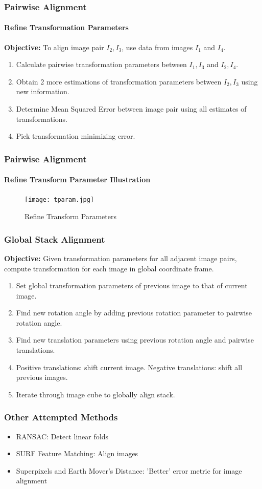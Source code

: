 \documentclass{beamer}
\begin{document}
\begin{frame}
\frametitle{Pairwise Alignment}
\framesubtitle{Refine Transformation Parameters}
\textbf{Objective:} To align image pair $I_2, I_3$, use data from images $I_1$ and $I_4$. \\
\begin{enumerate}
\item Calculate pairwise transformation parameters between $I_1,I_3$ and $I_2,I_4$.
\item Obtain 2 more estimations of transformation parameters between $I_2,I_3$ using new information.
\item Determine Mean Squared Error between image pair using all estimates of transformations.
\item Pick transformation minimizing error.
\end{enumerate}
\end{frame}

\begin{frame}
\frametitle{Pairwise Alignment}
\framesubtitle{Refine Transform Parameter Illustration}
\begin{figure}[p]
	\centering
	\texttt{[image: tparam.jpg]}
	\caption{Refine Transform Parameters}
	\label{fig:Tform Params}
\end{figure}
\end{frame}

\begin{frame}
\frametitle{Global Stack Alignment}
\textbf{Objective:} Given transformation parameters for all adjacent image pairs, compute transformation for each image in global coordinate frame.
\begin{enumerate}
\item Set global transformation parameters of previous image to that of current image. 
\item Find new rotation angle by adding previous rotation parameter to pairwise rotation angle. 
\item Find new translation parameters using previous rotation angle and pairwise translations.
\item Positive translations: shift current image. Negative translations: shift all previous images.
\item Iterate through image cube to globally align stack. 
\end{enumerate}
\end{frame}

\begin{frame}
\frametitle{Other Attempted Methods}
\begin{itemize}
\item RANSAC: Detect linear folds
\item SURF Feature Matching: Align images
\item Superpixels and Earth Mover's Distance: 'Better' error metric for image alignment
\end{itemize}
\end{frame}
\end{document}
